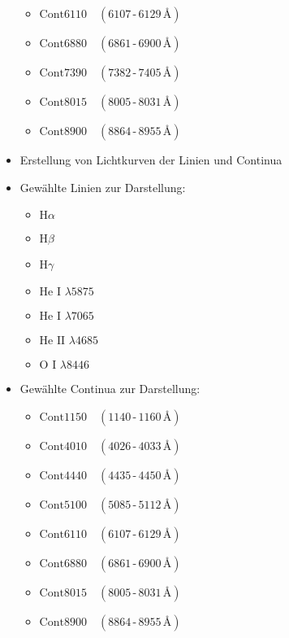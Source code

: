 \begin{itemize}
\begin{itemize}
		\item $\mathrm{Cont6110} \quad (6107\,\text{-}\,6129\,\text{\AA})$
		\item $\mathrm{Cont6880} \quad (6861\,\text{-}\,6900\,\text{\AA})$
		\item $\mathrm{Cont7390} \quad (7382\,\text{-}\,7405\,\text{\AA})$
		\item $\mathrm{Cont8015} \quad (8005\,\text{-}\,8031\,\text{\AA})$
		\item $\mathrm{Cont8900} \quad (8864\,\text{-}\,8955\,\text{\AA})$
	\end{itemize}
	\item Erstellung von Lichtkurven der Linien und Continua
	\item Gewählte Linien zur Darstellung: 
	\begin{itemize}
		\item \(\text{H}\alpha\)
		\item \(\text{H}\beta\)
		\item \(\text{H}\gamma\) 
		\item \(\text{He I } \lambda 5875\) 
		\item \(\text{He I } \lambda 7065\) 
		\item \(\text{He II } \lambda 4685\)
		\item \(\text{O I } \lambda 8446\)  
	\end{itemize}
	\item Gewählte Continua zur Darstellung: 
	\begin{itemize}
		\item $\mathrm{Cont1150} \quad (1140\,\text{-}\,1160\,\text{\AA})$
		\item $\mathrm{Cont4010} \quad (4026\,\text{-}\,4033\,\text{\AA})$
		\item $\mathrm{Cont4440} \quad (4435\,\text{-}\,4450\,\text{\AA})$
		\item $\mathrm{Cont5100} \quad (5085\,\text{-}\,5112\,\text{\AA})$
		\item $\mathrm{Cont6110} \quad (6107\,\text{-}\,6129\,\text{\AA})$
		\item $\mathrm{Cont6880} \quad (6861\,\text{-}\,6900\,\text{\AA})$
		\item $\mathrm{Cont8015} \quad (8005\,\text{-}\,8031\,\text{\AA})$
		\item $\mathrm{Cont8900} \quad (8864\,\text{-}\,8955\,\text{\AA})$ 
	

\end{itemize}
\end{itemize}
